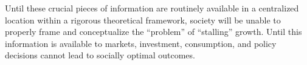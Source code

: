 Until these crucial pieces of information are routinely available 
in a centralized location within a rigorous theoretical framework, 
society will be unable to properly frame and conceptualize 
the ``problem'' of ``stalling'' growth. 
Until this information is available to markets,
investment, consumption, and policy decisions cannot
lead to socially optimal outcomes.









%
%




